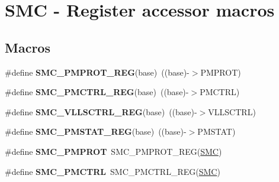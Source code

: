 \hypertarget{group__SMC__Register__Accessor__Macros}{}\section{S\+MC -\/ Register accessor macros}
\label{group__SMC__Register__Accessor__Macros}
\subsection*{Macros}
\begin{DoxyCompactItemize}
\item 
\#define {\bfseries S\+M\+C\+\_\+\+P\+M\+P\+R\+O\+T\+\_\+\+R\+EG}(base)~((base)-\/$>$P\+M\+P\+R\+OT)\hypertarget{group__SMC__Register__Accessor__Macros_ga8faa7aff53d9f78046264ed895ba4bcc}{}\label{group__SMC__Register__Accessor__Macros_ga8faa7aff53d9f78046264ed895ba4bcc}

\item 
\#define {\bfseries S\+M\+C\+\_\+\+P\+M\+C\+T\+R\+L\+\_\+\+R\+EG}(base)~((base)-\/$>$P\+M\+C\+T\+RL)\hypertarget{group__SMC__Register__Accessor__Macros_gaca57398aaa8f982675e83347cc971a66}{}\label{group__SMC__Register__Accessor__Macros_gaca57398aaa8f982675e83347cc971a66}

\item 
\#define {\bfseries S\+M\+C\+\_\+\+V\+L\+L\+S\+C\+T\+R\+L\+\_\+\+R\+EG}(base)~((base)-\/$>$V\+L\+L\+S\+C\+T\+RL)\hypertarget{group__SMC__Register__Accessor__Macros_ga9a6e9933d16883fed08331c84139a822}{}\label{group__SMC__Register__Accessor__Macros_ga9a6e9933d16883fed08331c84139a822}

\item 
\#define {\bfseries S\+M\+C\+\_\+\+P\+M\+S\+T\+A\+T\+\_\+\+R\+EG}(base)~((base)-\/$>$P\+M\+S\+T\+AT)\hypertarget{group__SMC__Register__Accessor__Macros_ga9d5f2b2a54cff2641473312ac780203e}{}\label{group__SMC__Register__Accessor__Macros_ga9d5f2b2a54cff2641473312ac780203e}

\item 
\#define {\bfseries S\+M\+C\+\_\+\+P\+M\+P\+R\+OT}~S\+M\+C\+\_\+\+P\+M\+P\+R\+O\+T\+\_\+\+R\+EG(\hyperlink{group__SMC__Peripheral__Access__Layer_ga6667e81e5b32250febd3d46511d9309d}{S\+MC})\hypertarget{group__SMC__Register__Accessor__Macros_ga43f6628ef790c765722cee208c2c477d}{}\label{group__SMC__Register__Accessor__Macros_ga43f6628ef790c765722cee208c2c477d}

\item 
\#define {\bfseries S\+M\+C\+\_\+\+P\+M\+C\+T\+RL}~S\+M\+C\+\_\+\+P\+M\+C\+T\+R\+L\+\_\+\+R\+EG(\hyperlink{group__SMC__Peripheral__Access__Layer_ga6667e81e5b32250febd3d46511d9309d}{S\+MC})\hypertarget{group__SMC__Register__Accessor__Macros_ga4b2bae0309aecee21e9fe70ac7dbe3dc}{}\label{group__SMC__Register__Accessor__Macros_ga4b2bae0309aecee21e9fe70ac7dbe3dc}


\end{DoxyCompactItemize}
